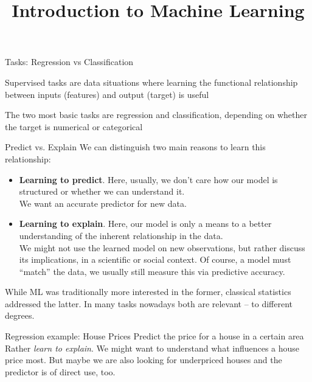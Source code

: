 \documentclass[11pt,compress,t,notes=noshow, xcolor=table]{beamer}
\title{Introduction to Machine Learning}
\begin{document}


\begin{framei}{Tasks: Regression vs Classification}
\item Supervised tasks are data situations where learning the functional relationship between inputs (features) and output (target) is useful
\item The two most basic tasks are regression and classification, depending on whether the target is numerical or categorical
\vfill
{}
\end{framei}


\begin{framev}{Predict vs. Explain}
We can distinguish two main reasons to learn this relationship:
\begin{itemize}
\item \textbf{Learning to predict}. Here, usually, we don't care how our model is structured or whether we can understand it.\\
We want an accurate predictor for new data.
\item \textbf{Learning to explain}. Here, our model is only a means to a better understanding of the inherent relationship in the data.\\
We might not use the learned model on new observations, but rather discuss its implications, in a scientific or social context.
Of course, a model must ``match'' the data, we usually still measure this via predictive accuracy. 
\end{itemize}  
\vfill
While ML was traditionally more interested in the former, classical statistics addressed the latter.
In many tasks nowadays both are relevant -- to different degrees.
\end{framev}


\begin{framev}{Regression example: House Prices}
Predict the price for a house in a certain area
\vfill
{} %
\vfill
{}
\vfill
Rather \textit{learn to explain}. We might want to understand what influences a house price most.
But maybe we are also looking for underpriced houses and the predictor is of direct use, too.
\end{framev}
\end{document}
